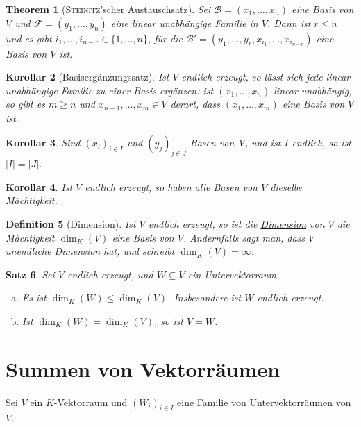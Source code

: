 \documentclass[ngerman,a4paper]{report}
\theoremstyle{changebreak}
\newtheorem{theorem}{Theorem}[section]
\newtheorem{corollar}[theorem]{Korollar}
\newtheorem{satz}[theorem]{Satz}
\newtheorem{definition}[theorem]{Definition}
\newcommand{\begriff}[2][]{\uline{#2}\index{#1#2}}
\newcommand{\person}[1]{\textsc{#1}}
\begin{document}
\begin{theorem}[\person{Steinitz}'scher Austauschsatz]
	Sei $\mathcal{B}=(x_1, \dotsc, x_n)$ eine Basis von $V$ und $\mathcal{F} = (y_1, \dotsc, y_n)$ eine linear unabhängige Familie in $V$. Dann ist $r \le n$ und es gibt $i_1, \dotsc, i_{n-r} \in \{ 1, \dotsc, n \}$, für die $\mathcal{B}' = (y_1, \dotsc, y_r, x_{i_1}, \dotsc, x_{i_{n-r}})$ eine Basis von $V$ ist.
\end{theorem}

\begin{corollar}[Basisergänzungssatz]
	Ist $V$ endlich erzeugt, so lässt sich jede linear unabhängige Familie zu einer Basis ergänzen: ist $(x_1, \dotsc, x_n)$ linear unabhängig, so gibt es $m \ge n$ und $x_{n+1}, \dotsc, x_{m}\in V$ derart, dass $(x_1, \dotsc, x_m)$ eine Basis von $V$ ist.
\end{corollar}

\begin{corollar}
	Sind $(x_i)_{i\in I}$ und $(y_j)_{j\in J}$ Basen von V, und ist $I$ endlich, so ist $|I| = |J|$.
\end{corollar}

\begin{corollar}
	Ist $V$ endlich erzeugt, so haben alle Basen von $V$ dieselbe Mächtigkeit.
\end{corollar}

\begin{definition}[Dimension]
	Ist $V$ endlich erzeugt, so ist die \begriff{Dimension} von $V$ die Mächtigkeit $\dim_K(V)$ eine Basis von $V$. Andernfalls sagt man, dass $V$ unendliche Dimension hat, und schreibt $\dim_K(V) = \infty$.
\end{definition}
\addtocounter{theorem}{2}
\begin{satz}
	Sei $V$ endlich erzeugt, und $W\subseteq V$ ein Untervektorraum.
	\begin{enumerate}[(a)]
		\item Es ist $\dim_K(W) \le \dim_K(V)$. Insbesondere ist $W$ endlich erzeugt.
		\item Ist $\dim_K(W) = \dim_K(V)$, so ist $V = W$.
	\end{enumerate}
\end{satz}

\section{Summen von Vektorräumen}
Sei $V$ ein $K$-Vektorraum und $(W_i)_{i\in I}$ eine Familie von Untervektorräumen von $V$.
\end{document}
